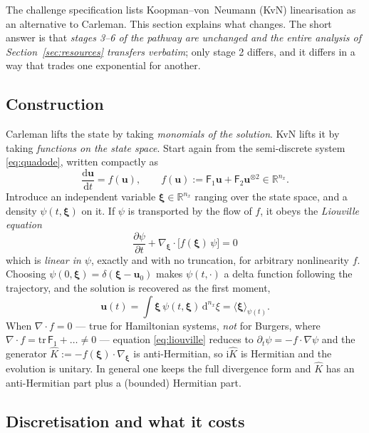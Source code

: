\documentclass[11pt,a4paper]{article}
\theoremstyle{plain}
\theoremstyle{definition}
\theoremstyle{remark}
\newcommand{\R}{\mathbb{R}}
\newcommand{\dd}{\mathrm{d}}
\newcommand{\ii}{\mathrm{i}}
\newcommand{\uvec}{\bm{u}}
\newcommand{\Fone}{\mathsf{F}_1}
\newcommand{\Ftwo}{\mathsf{F}_2}
\begin{document}
The challenge specification lists Koopman--von~Neumann (KvN) linearisation as an
alternative to Carleman.  This section explains what changes.  The short answer
is that \emph{stages 3--6 of the pathway are unchanged and the entire analysis of
Section~\ref{sec:resources} transfers verbatim}; only stage 2 differs, and it
differs in a way that trades one exponential for another.

\subsection{Construction}

Carleman lifts the state by taking \emph{monomials of the solution}.  KvN lifts
it by taking \emph{functions on the state space}.  Start again from the
semi-discrete system \eqref{eq:quadode}, written compactly as
\begin{equation}
\frac{\dd\uvec}{\dd t}=f(\uvec),
\qquad f(\uvec):=\Fone\uvec+\Ftwo\uvec^{\otimes2}\in\R^{n_x}.
\end{equation}
Introduce an independent variable $\bm\xi\in\R^{n_x}$ ranging over the state
space, and a density $\psi(t,\bm\xi)$ on it.  If $\psi$ is transported by the
flow of $f$, it obeys the \emph{Liouville equation}
\begin{equation}
\boxed{\ \frac{\partial\psi}{\partial t}
+\nabla_{\bm\xi}\!\cdot\!\bigl[f(\bm\xi)\,\psi\bigr]=0\ }
\label{eq:liouville}
\end{equation}
which is \emph{linear in $\psi$}, exactly and with no truncation, for arbitrary
nonlinearity $f$.  Choosing $\psi(0,\bm\xi)=\delta(\bm\xi-\uvec_0)$ makes
$\psi(t,\cdot)$ a delta function following the trajectory, and the solution is
recovered as the first moment,
\begin{equation}
\uvec(t)=\int \bm\xi\,\psi(t,\bm\xi)\,\dd^{n_x}\xi
=\langle\bm\xi\rangle_{\psi(t)} .
\label{eq:kvnreadout}
\end{equation}
When $\nabla\!\cdot\!f=0$ --- true for Hamiltonian systems, \emph{not} for
Burgers, where $\nabla\!\cdot\!f=\mathrm{tr}\,\Fone+\ldots\ne0$ --- equation
\eqref{eq:liouville} reduces to $\partial_t\psi=-f\!\cdot\!\nabla\psi$ and the
generator $\hat K:=-f(\bm\xi)\!\cdot\!\nabla_{\bm\xi}$ is anti-Hermitian, so
$\ii\hat K$ is Hermitian and the evolution is unitary.  In general one keeps the
full divergence form and $\hat K$ has an anti-Hermitian part plus a
(bounded) Hermitian part.

\subsection{Discretisation and what it costs}
\end{document}
